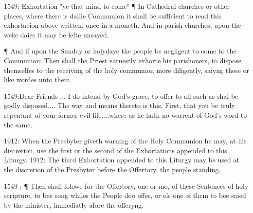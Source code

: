 

1549: Exhortation "ye that mind to come"
¶ In Cathedral churches or other places, where there is dailie Communion it shall be sufficient to read this exhortacion above written, once in a moneth. And in parish churches, upon the weke daies it may be lefte unsayed.

¶ And if upon the Sunday or holydaye the people be negligent to come to the Communion: Then shall the Priest earnestly exhorte his parishoners, to dispose themselfes to the receiving of the holy communion more diligently, saiyng these or like wordes unto them.

1549:Dear Friends ... I do intend by God's grace, to offer to all such as shal be godly disposed.... The way and means thereto is this,
First, that you be truly repentant of your former evil life....where as he hath no warrent of God's word to the same.

1912: When the Presbyter giveth warning of the Holy Communion he may, at his discretion, use the first or the second of the Exhortations appended to this Liturgy.
1912: The third Exhortation appended to this Liturgy may be used at the discretion of the Presbyter before the Offertory, the people standing.

1549 : ¶ Then shall folowe for the Offertory, one or mo, of these Sentences of holy scripture, to bee song whiles the People doo offer, or els one of them to bee saied by the minister, immediatly afore the offeryng.



